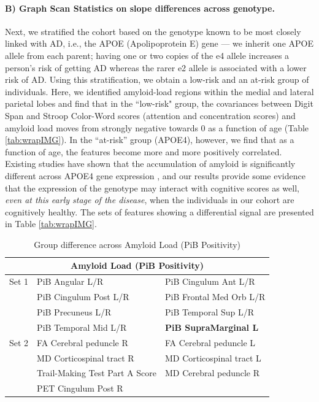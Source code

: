 \paragraph{B) Graph Scan Statistics on slope differences across genotype.} 
Next, we stratified the cohort
 based on the genotype known to be most closely linked with AD, i.e., the APOE (Apolipoprotein E) gene \citep{corder1993gene} --- 
we inherit one APOE allele from each parent; having one or two copies of the e4 allele increases a person's risk of getting AD 
whereas the rarer e2 allele is associated with a lower risk of AD. 
Using this stratification, we obtain a low-risk and an at-risk group of individuals. 
Here, we identified amyloid-load regions within the medial and lateral parietal lobes 
and find that in the ``low-risk" group, the covariances between Digit Span and Stroop Color-Word scores 
(attention and concentration scores) and amyloid load moves from strongly negative towards $0$ as a function of age (Table \ref{tab:wrapIMG}). 
In the ``at-risk'' group 
(APOE4), however, we find that as a function of age, the features become more and more positively correlated. 
Existing studies have shown that the accumulation 
of amyloid is significantly different across APOE4 gene expression \citep{mormino2014amyloid}, and our results provide some evidence 
that the expression of the genotype may interact with cognitive scores as well, {\em even at this early stage of the disease}, 
when the individuals in our cohort are 
cognitively healthy. The sets of features showing a differential signal are presented in Table \ref{tab:wrapIMG}.
%

\begin{table}
	\centering
	\begin{tabular}{lll}
		\toprule
		\multicolumn{3}{c}{\textbf{Amyloid Load (PiB Positivity)}}\\ \midrule \midrule
		Set 1 & PiB Angular L/R & PiB Cingulum Ant L/R \\
		& PiB Cingulum Post L/R & PiB Frontal Med Orb L/R \\
		& PiB Precuneus L/R & PiB Temporal Sup L/R \\
		& PiB Temporal Mid L/R & \textbf{PiB SupraMarginal L} \\
		\midrule
		Set 2     & FA Cerebral peduncle R   & FA Cerebral peduncle L	\\
		& MD Corticospinal tract R	& MD Corticospinal tract L		\\
		& Trail-Making Test Part A Score  & MD Cerebral peduncle R \\ 
		&PET Cingulum Post R  &  \\ \midrule\bottomrule
	\end{tabular}
	\caption{Group difference across Amyloid Load (PiB Positivity)}
	\label{tab:wrapPIB}
\end{table}

